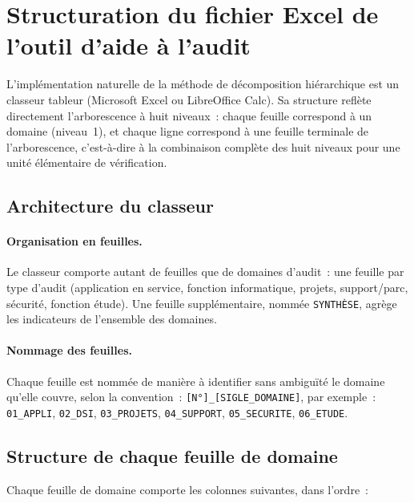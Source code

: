 \section{Structuration du fichier Excel de l'outil d'aide à l'audit}
\label{sec:excel}

L'implémentation naturelle de la méthode de décomposition hiérarchique est un
classeur tableur (Microsoft Excel ou LibreOffice Calc). Sa structure reflète
directement l'arborescence à huit niveaux~: chaque feuille correspond à un
domaine (niveau~1), et chaque ligne correspond à une feuille terminale de
l'arborescence, c'est-à-dire à la combinaison complète des huit niveaux pour une
unité élémentaire de vérification.

\subsection{Architecture du classeur}

\paragraph{Organisation en feuilles.}
Le classeur comporte autant de feuilles que de domaines d'audit~: une feuille
par type d'audit (application en service, fonction informatique, projets,
support/parc, sécurité, fonction étude). Une feuille supplémentaire, nommée
\texttt{SYNTHÈSE}, agrège les indicateurs de l'ensemble des domaines.

\paragraph{Nommage des feuilles.}
Chaque feuille est nommée de manière à identifier sans ambiguïté le domaine
qu'elle couvre, selon la convention~: \texttt{[N°]\_[SIGLE\_DOMAINE]}, par
exemple~: \texttt{01\_APPLI}, \texttt{02\_DSI}, \texttt{03\_PROJETS},
\texttt{04\_SUPPORT}, \texttt{05\_SECURITE}, \texttt{06\_ETUDE}.

\subsection{Structure de chaque feuille de domaine}

Chaque feuille de domaine comporte les colonnes suivantes, dans l'ordre~:

